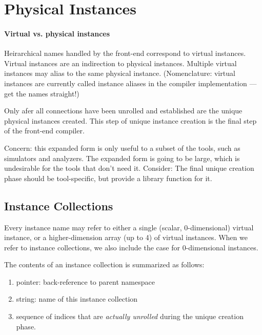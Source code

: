 
\chapter{Physical Instances}
\label{sec:instance}

\subsubsection{Virtual vs. physical instances}

Heirarchical names handled by the front-end correspond to virtual instances.  
Virtual instances are an indirection to physical instances.  
Multiple virtual instances may alias to the same physical instance.  
(Nomenclature: virtual instances are currently called instance aliases
	in the compiler implementation --- get the names straight!)

Only afer all connections have been unrolled and established are the 
unique physical instances created.  
This step of unique instance creation is the final step of the 
front-end compiler.  

Concern: this expanded form is only useful to a subset of the tools, 
such as simulators and analyzers.  
The expanded form is going to be large, which is undesirable for 
the tools that don't need it.  
Consider: The final unique creation phase should be tool-specific, 
but provide a library function for it.  

\section{Instance Collections}
\label{sec:instance:collection}

Every instance name may refer to either a single (scalar, 0-dimensional)
virtual instance, or a higher-dimension array (up to 4) of virtual instances.  
When we refer to instance collections, we also include the case for
0-dimensional instances.  

The contents of an instance collection is summarized as follows:

\begin{enumerate}
\item pointer: back-reference to parent namespace
\item string: name of this instance collection
\item sequence of indices that are \emph{actually unrolled}
	during the unique creation phase.  
\end{enumerate}

